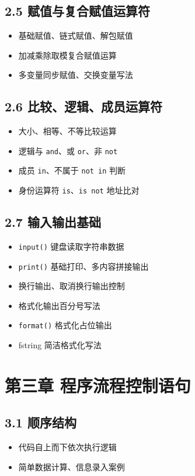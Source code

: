 \subsection{2.5 赋值与复合赋值运算符}
\begin{itemize}
\item 基础赋值、链式赋值、解包赋值
\item 加减乘除取模复合赋值运算
\item 多变量同步赋值、交换变量写法
\end{itemize}

\subsection{2.6 比较、逻辑、成员运算符}
\begin{itemize}
\item 大小、相等、不等比较运算
\item 逻辑与 \texttt{and}、或 \texttt{or}、非 \texttt{not}
\item 成员 \texttt{in}、不属于 \texttt{not in} 判断
\item 身份运算符 \texttt{is}、\texttt{is not} 地址比对
\end{itemize}

\subsection{2.7 输入输出基础}
\begin{itemize}
\item \texttt{input()} 键盘读取字符串数据
\item \texttt{print()} 基础打印、多内容拼接输出
\item 换行输出、取消换行输出控制
\item 格式化输出百分号写法
\item \texttt{format()} 格式化占位输出
\item f\text{-}string 简洁格式化写法
\end{itemize}

\section{第三章 程序流程控制语句}
\subsection{3.1 顺序结构}
\begin{itemize}
\item 代码自上而下依次执行逻辑
\item 简单数据计算、信息录入案例
\end{itemize}

